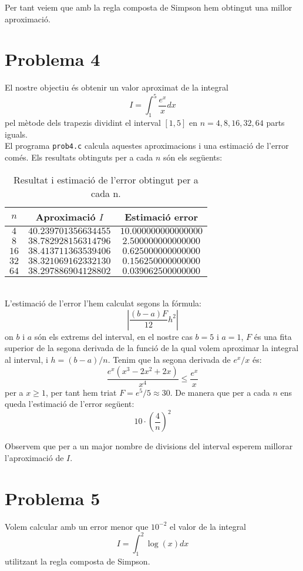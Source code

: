\documentclass[12pt]{article}
\begin{document}
	Per tant veiem que amb la regla composta de Simpson hem obtingut una millor aproximació.
	\newpage
	\section*{Problema 4}
	El nostre objectiu és obtenir un valor aproximat de la integral
	\begin{equation*}
	I=\int^{5}_1\dfrac{e^x}{x}dx
	\end{equation*}
	pel mètode dels trapezis dividint el interval $[1,5]$ en $n=4, 8, 16, 32, 64$ parts iguals.\\
	
	El programa \texttt{prob4.c} calcula aquestes aproximacions i una estimació de l'error comés. Els resultats obtinguts per a cada $n$ són els següents:
	\begin{table}[h!]
		\centering
		\caption{Resultat i estimació de l'error obtingut per a cada n.}	
		\begin{tabular}{c|c|c}
			$n$ & Aproximació $I$ &Estimació error\\
			\hline
			\hline
			$4$ & $40.239701356634455$  &$10.000000000000000$\\
			$8$ & $38.782928156314796$ &$2.500000000000000$\\
			$16$ & $38.413711363539406$ &$0.625000000000000$\\
			$32$ & $38.321069162332130$ &$0.156250000000000$\\
			$64$ & $38.297886904128802$ &$0.039062500000000$\\
		\end{tabular}
	\end{table}\\
	L'estimació de l'error l'hem calculat segons la fórmula:
	$$\left| \dfrac{(b-a)F}{12}h^2 \right| $$
	on $b$ i $a$ són els extrems del interval, en el nostre cas $b=5$ i $a=1$, $F$ és una fita superior de la segona derivada de la funció de la qual volem aproximar la integral al interval, i $h=(b-a)/n$. Tenim que la segona derivada de $e^x/x$ és:
	$$\dfrac{e^x(x^3-2x^2+2x)}{x^4}\leq\dfrac{e^x}{x}$$
	per a $x\geq 1$, per tant hem triat $F=e^5/5\approx30$. De manera que per a cada $n$ ens queda l'estimació de l'error següent:
	$$10\cdot\left( \frac{4}{n}\right)^2 $$
	
	Observem que per a un major nombre de divisions del interval esperem millorar l'aproximació de $I$.
	
	\newpage
	\section*{Problema 5}
	Volem calcular amb un error menor que $10^{-2}$ el valor de la integral
	$$I=\int_{1}^{2}\log(x)dx$$
	utilitzant la regla composta de Simpson.\\
	
\end{document}
